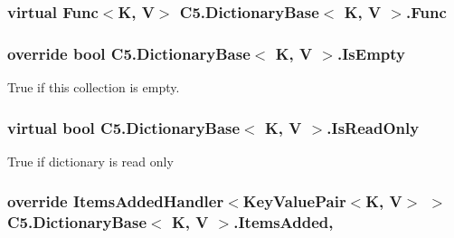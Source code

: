 \subsubsection[{Func}]{\setlength{\rightskip}{0pt plus 5cm}virtual Func$<$K, V$>$ {\bf C5.\+Dictionary\+Base}$<$ K, V $>$.Func\hspace{0.3cm}{\ttfamily [get]}}\label{class_c5_1_1_dictionary_base_afd227ddeb666195929f2b441b0c07bb7}




\hypertarget{class_c5_1_1_dictionary_base_a6749a3f0ec6472fab5365732c66e826b}{}
\subsubsection[{Is\+Empty}]{\setlength{\rightskip}{0pt plus 5cm}override bool {\bf C5.\+Dictionary\+Base}$<$ K, V $>$.Is\+Empty\hspace{0.3cm}{\ttfamily [get]}}\label{class_c5_1_1_dictionary_base_a6749a3f0ec6472fab5365732c66e826b}




True if this collection is empty.\hypertarget{class_c5_1_1_dictionary_base_a12af62ed33fb01b0f103be5d4351e192}{}
\subsubsection[{Is\+Read\+Only}]{\setlength{\rightskip}{0pt plus 5cm}virtual bool {\bf C5.\+Dictionary\+Base}$<$ K, V $>$.Is\+Read\+Only\hspace{0.3cm}{\ttfamily [get]}}\label{class_c5_1_1_dictionary_base_a12af62ed33fb01b0f103be5d4351e192}




True if dictionary is read only\hypertarget{class_c5_1_1_dictionary_base_a3a1267cb8e0b1d260ce133d3961b2c59}{}
\subsubsection[{Items\+Added}]{\setlength{\rightskip}{0pt plus 5cm}override Items\+Added\+Handler$<${\bf Key\+Value\+Pair}$<$K, V$>$ $>$ {\bf C5.\+Dictionary\+Base}$<$ K, V $>$.Items\+Added\hspace{0.3cm}{\ttfamily [add]}, {\ttfamily [remove]}}\label{class_c5_1_1_dictionary_base_a3a1267cb8e0b1d260ce133d3961b2c59}



